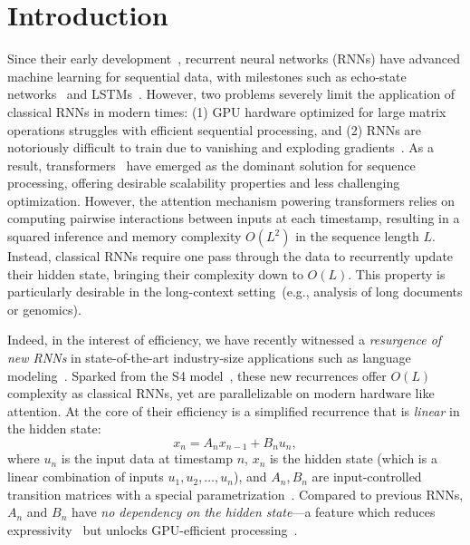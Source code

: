 \section{Introduction}

Since their early development~\citep{rumelhart1986sequential, elman1990finding}, recurrent neural networks (RNNs) have advanced machine learning for sequential data, with milestones such as echo-state networks~\citep{jaeger2001echo} and LSTMs~\citep{hochreiter1997long}. However, two problems severely limit the application of classical RNNs in modern times: (1) GPU hardware optimized for large matrix operations struggles with efficient sequential processing, and (2) RNNs are notoriously difficult to train due to vanishing and exploding gradients~\citep{bengio1994learning, pascanu2013difficulty}. As a result, transformers~\citep{vaswani2017attention} have emerged as the dominant solution for sequence processing, offering desirable scalability properties and less challenging optimization. However, the attention mechanism powering transformers relies on computing pairwise interactions between inputs at each timestamp, resulting in a squared inference and memory complexity $O(L^2)$ in the sequence length $L$. Instead, classical RNNs require one pass through the data to recurrently update their hidden state, bringing their complexity down to $O(L)$. This property is particularly desirable in the long-context setting~(e.g., analysis of long documents or genomics).

Indeed, in the interest of efficiency, we have recently witnessed a \textit{resurgence of new RNNs} in state-of-the-art industry-size applications such as language modeling~\citep{gu2024mamba, peng2024eagle, qin2024hgrn2, de2024griffin, yang2024parallelizing}. Sparked from the S4 model~\citep{gu2022efficiently}, these new recurrences offer $O(L)$ complexity as classical RNNs, yet are parallelizable on modern hardware like attention. At the core of their efficiency is a simplified recurrence that is \textit{linear} in the hidden state:
\begin{equation}
    x_{n} = A_n x_{n-1} + B_n u_n, 
    \label{eq:1}
\end{equation}
where $u_n$ is the input data at timestamp $n$, $x_n$ is the hidden state (which is a linear combination of inputs $u_1,u_2,\dots, u_n$), and $A_n,B_n$ are input-controlled transition matrices with a special parametrization~\citep{orvieto2023resurrecting}. Compared to previous RNNs, $A_n$ and $B_n$ have\textit{ no dependency on the hidden state}---a feature which reduces expressivity~\citep{merrill2024illusion,cirone2024theoretical} but unlocks GPU-efficient processing~\citep{martin2018parallelizing, smith2023simplified}.


